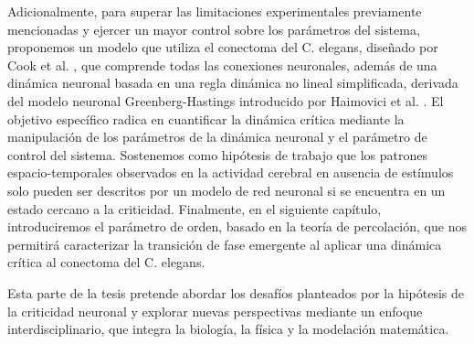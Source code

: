 Adicionalmente, para superar las limitaciones experimentales previamente mencionadas y ejercer un mayor control sobre los parámetros del sistema, proponemos un modelo que utiliza el conectoma del C. elegans, diseñado por Cook et al. \cite{cook_whole-animal_2019}, que comprende todas las conexiones neuronales, además de una dinámica neuronal basada en una regla dinámica no lineal simplificada, derivada del modelo neuronal Greenberg-Hastings introducido por Haimovici et al. \cite{haimovici_brain_2013}. El objetivo específico radica en cuantificar la dinámica crítica mediante la manipulación de los parámetros de la dinámica neuronal y el parámetro de control del sistema. Sostenemos como hipótesis de trabajo que los patrones espacio-temporales observados en la actividad cerebral en ausencia de estímulos solo pueden ser descritos por un modelo de red neuronal si se encuentra en un estado cercano a la criticidad. Finalmente, en el siguiente capítulo, introduciremos el parámetro de orden, basado en la teoría de percolación, que nos permitirá caracterizar la transición de fase emergente al aplicar una dinámica crítica al conectoma del C. elegans.

Esta parte de la tesis pretende abordar los desafíos planteados por la hipótesis de la criticidad neuronal y explorar nuevas perspectivas mediante un enfoque interdisciplinario, que integra la biología, la física y la modelación matemática.









